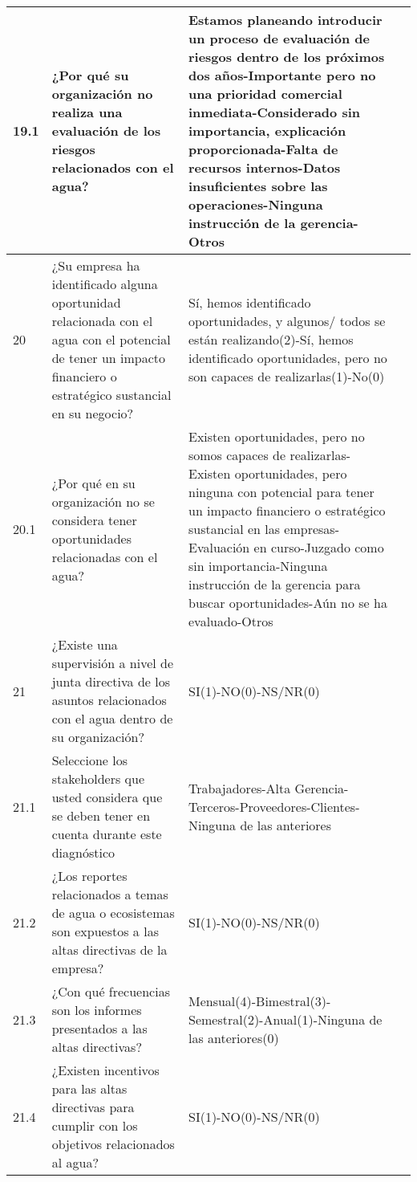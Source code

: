 \begin{longtable}{p{0.75cm}|p{6cm}|p{6cm}|p{2cm}}
\hline
19.1 & ¿Por qué su organización no realiza una evaluación de los riesgos relacionados con el agua? & Estamos planeando introducir un proceso de evaluación de riesgos dentro de los próximos dos años-Importante pero no una prioridad comercial inmediata-Considerado sin importancia, explicación proporcionada-Falta de recursos internos-Datos insuficientes sobre las operaciones-Ninguna instrucción de la gerencia-Otros & \parencite{disclosure-insight-action-2023} \\
\hline
20 & ¿Su empresa ha identificado alguna oportunidad relacionada con el agua con el potencial de tener un impacto financiero o estratégico sustancial en su negocio? & Sí, hemos identificado oportunidades, y algunos/ todos se están realizando(2)-Sí, hemos identificado oportunidades, pero no son capaces de realizarlas(1)-No(0) & \parencite{disclosure-insight-action-2023} \\
\hline
20.1 & ¿Por qué en su organización no se considera tener oportunidades relacionadas con el agua? & Existen oportunidades, pero no somos capaces de realizarlas-Existen oportunidades, pero ninguna con potencial para tener un impacto financiero o estratégico sustancial en las empresas-Evaluación en curso-Juzgado como sin importancia-Ninguna instrucción de la gerencia para buscar oportunidades-Aún no se ha evaluado-Otros & \parencite{disclosure-insight-action-2023} \\
\hline
21 & ¿Existe una supervisión a nivel de junta directiva de los asuntos relacionados con el agua dentro de su organización? & SI(1)-NO(0)-NS/NR(0) & \parencite{disclosure-insight-action-2023} \\
\hline
21.1 & Seleccione los stakeholders que usted considera que se deben tener en cuenta durante este diagnóstico & Trabajadores-Alta Gerencia-Terceros-Proveedores-Clientes-Ninguna de las anteriores & \parencite{capitals-coalition-2021} \\
\hline
21.2 & ¿Los reportes relacionados a temas de agua o ecosistemas son expuestos a las altas directivas de la empresa? & SI(1)-NO(0)-NS/NR(0) & \parencite{ceres-2023A} \\
\hline
21.3 & ¿Con qué frecuencias son los informes presentados a las altas directivas? & Mensual(4)-Bimestral(3)-Semestral(2)-Anual(1)-Ninguna de las anteriores(0) & \parencite{ceres-2023A} \\
\hline
21.4 & ¿Existen incentivos para las altas directivas para cumplir con los objetivos relacionados al agua? & SI(1)-NO(0)-NS/NR(0) & \parencite{ceres-2023A} \\

\end{longtable}
